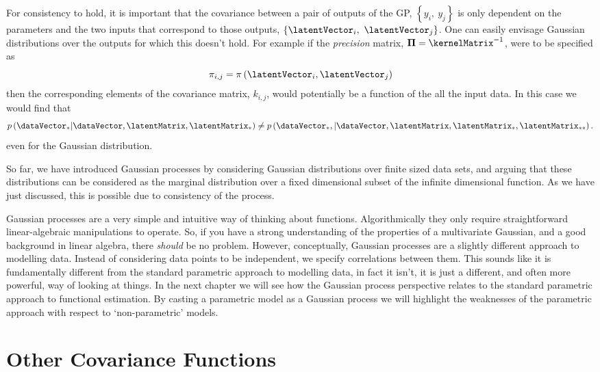 For consistency to hold, it is important that the covariance between a
pair of outputs of the GP, $\left\{y_i,\ y_j\right\}$ is only
dependent on the parameters and the two inputs that correspond to
those outputs, $\left\{\latentVector_i,\ \latentVector_j\right\}$. One can
easily envisage Gaussian distributions over the outputs for which this
doesn't hold. For example if the \emph{precision} matrix,
$\boldsymbol{\Pi}=\kernelMatrix^{-1}$, were to be specified as
\[
\pi_{i,j}=\pi\left(\latentVector_i,\latentVector_j\right) 
\]
then the corresponding elements of the covariance matrix, $k_{i,j}$,
would potentially be a function of the all the input data. In this
case we would find that
\[
p\left(\dataVector_{*}|\dataVector, \latentMatrix,
  \latentMatrix_{*}\right) \neq p\left(\dataVector_{*},
  |\dataVector, \latentMatrix, \latentMatrix_*,
  \latentMatrix_{**}\right).
\]
even for the Gaussian distribution. 

So far, we have introduced Gaussian processes by considering Gaussian
distributions over finite sized data sets, and arguing that these
distributions can be considered as the marginal distribution over a
fixed dimensional subset of the infinite dimensional function. As we
have just discussed, this is possible due to consistency of the
process.

Gaussian processes are a very simple and intuitive way of thinking
about functions. Algorithmically they only require straightforward
linear-algebraic manipulations to operate. So, if you have a strong
understanding of the properties of a multivariate Gaussian, and a good
background in linear algebra, there \emph{should} be no
problem. However, conceptually, Gaussian processes are a slightly
different approach to modelling data. Instead of considering data
points to be independent, we specify correlations between them. This
sounds like it is fundamentally different from the standard parametric
approach to modelling data, in fact it isn't, it is just a different,
and often more powerful, way of looking at things. In the next chapter
we will see how the Gaussian process perspective relates to the
standard parametric approach to functional estimation. By casting a
parametric model as a Gaussian process we will highlight the
weaknesses of the parametric approach with respect to
`non-parametric' models.


\section{Other Covariance Functions}\label{sub:covarianceFunctions}

